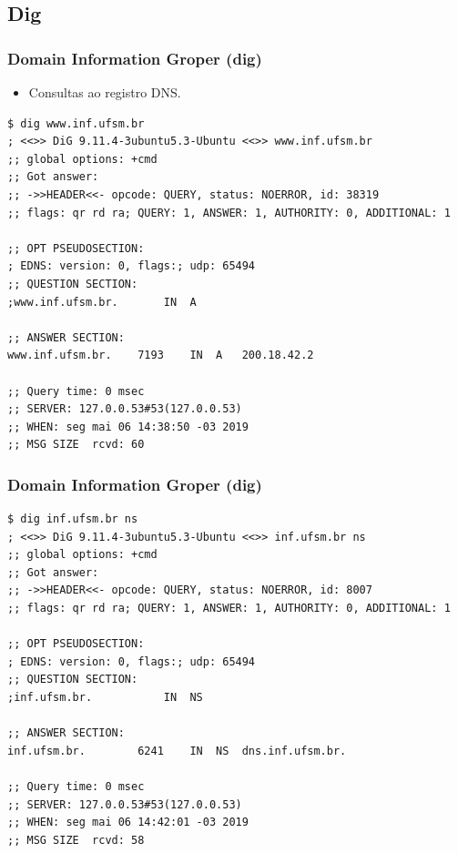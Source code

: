 \documentclass[xcolor=dvipsnames,10pt,compress,aspectratio=169]{beamer}
\begin{document}
\subsection{Dig}
\begin{frame}[fragile]
	\frametitle{Domain Information Groper (dig)}
\begin{itemize}
	\item Consultas ao registro DNS.
\end{itemize}
\begin{small}
\begin{verbatim}
$ dig www.inf.ufsm.br
; <<>> DiG 9.11.4-3ubuntu5.3-Ubuntu <<>> www.inf.ufsm.br
;; global options: +cmd
;; Got answer:
;; ->>HEADER<<- opcode: QUERY, status: NOERROR, id: 38319
;; flags: qr rd ra; QUERY: 1, ANSWER: 1, AUTHORITY: 0, ADDITIONAL: 1

;; OPT PSEUDOSECTION:
; EDNS: version: 0, flags:; udp: 65494
;; QUESTION SECTION:
;www.inf.ufsm.br.		IN	A

;; ANSWER SECTION:
www.inf.ufsm.br.	7193	IN	A	200.18.42.2

;; Query time: 0 msec
;; SERVER: 127.0.0.53#53(127.0.0.53)
;; WHEN: seg mai 06 14:38:50 -03 2019
;; MSG SIZE  rcvd: 60
\end{verbatim}
\end{small}
\end{frame}
\begin{frame}[fragile]
	\frametitle{Domain Information Groper (dig)}
\begin{small}
\begin{verbatim}
$ dig inf.ufsm.br ns
; <<>> DiG 9.11.4-3ubuntu5.3-Ubuntu <<>> inf.ufsm.br ns
;; global options: +cmd
;; Got answer:
;; ->>HEADER<<- opcode: QUERY, status: NOERROR, id: 8007
;; flags: qr rd ra; QUERY: 1, ANSWER: 1, AUTHORITY: 0, ADDITIONAL: 1

;; OPT PSEUDOSECTION:
; EDNS: version: 0, flags:; udp: 65494
;; QUESTION SECTION:
;inf.ufsm.br.			IN	NS

;; ANSWER SECTION:
inf.ufsm.br.		6241	IN	NS	dns.inf.ufsm.br.

;; Query time: 0 msec
;; SERVER: 127.0.0.53#53(127.0.0.53)
;; WHEN: seg mai 06 14:42:01 -03 2019
;; MSG SIZE  rcvd: 58
\end{verbatim}
\end{small}
\end{frame}
\end{document}
